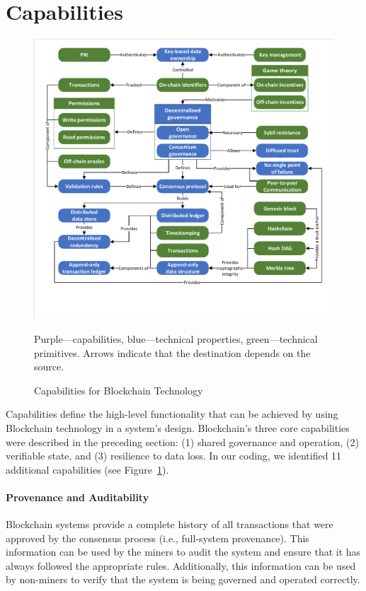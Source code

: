 \section{Capabilities}
\label{sec:capabilities}

\begin{figure}
	\centering
	\includegraphics[page=4,width=\columnwidth]{figures/grounded-theory-main}
	
	{\small Purple---capabilities, blue---technical properties, green---technical primitives. Arrows indicate that the destination depends on the source.}
	\caption{Capabilities for Blockchain Technology}
	\label{fig:Capabilities}
\end{figure}

Capabilities define the high-level functionality that can be achieved by using Blockchain technology in a system's design.
Blockchain's three core capabilities were described in the preceding section: (1) shared governance and operation, (2) verifiable state, and (3) resilience to data loss.
In our coding, we identified 11 additional capabilities (see Figure~\ref{fig:Capabilities}).

\paragraph{Provenance and Auditability}
Blockchain systems provide a complete history of all transactions that were approved by the consensus process (i.e., full-system provenance).
This information can be used by the miners to audit the system and ensure that it has always followed the appropriate rules.
Additionally, this information can be used by non-miners to verify that the system is being governed and operated correctly.

